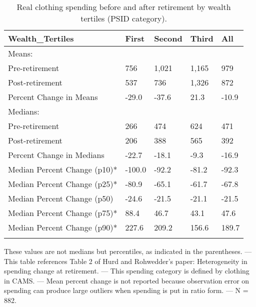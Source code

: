 \begin{table}[tbp] \centering
{}

\caption{Real clothing spending before and after retirement by wealth tertiles (PSID category).}
\begin{tabularx}{\textwidth}{lCCCC}

\toprule
{Wealth\_Tertiles}&{First}&{Second}&{Third}&{All} \tabularnewline
\midrule\addlinespace[1.5ex]
Means:&&&& \tabularnewline
\midrule Pre-retirement&756&1,021&1,165&979 \tabularnewline
Post-retirement&537&736&1,326&872 \tabularnewline
Percent Change in Means&-29.0&-37.6&21.3&-10.9 \tabularnewline
\midrule Medians:&&&& \tabularnewline
\midrule Pre-retirement&266&474&624&471 \tabularnewline
Post-retirement&206&388&565&392 \tabularnewline
Percent Change in Medians&-22.7&-18.1&-9.3&-16.9 \tabularnewline
Median Percent Change (p10)*&-100.0&-92.2&-81.2&-92.3 \tabularnewline
Median Percent Change (p25)*&-80.9&-65.1&-61.7&-67.8 \tabularnewline
Median Percent Change (p50)&-24.6&-21.5&-21.1&-21.5 \tabularnewline
Median Percent Change (p75)*&88.4&46.7&43.1&47.6 \tabularnewline
Median Percent Change (p90)*&227.6&209.2&156.6&189.7 \tabularnewline
\bottomrule \addlinespace[1.5ex]

\end{tabularx}
\begin{flushleft}
\footnotesize *These values are not medians but percentiles, as indicated in the parentheses. \linebreak --- \linebreak This table references Table 2 of Hurd and Rohwedder's paper: Heterogeneity in spending change at retirement. \linebreak --- \linebreak This spending category is defined by clothing in CAMS. \linebreak --- \linebreak Mean percent change is not reported because observation error on spending can produce large outliers when spending is put in ratio form. \linebreak --- \linebreak N = 882.
\end{flushleft}
\end{table}
